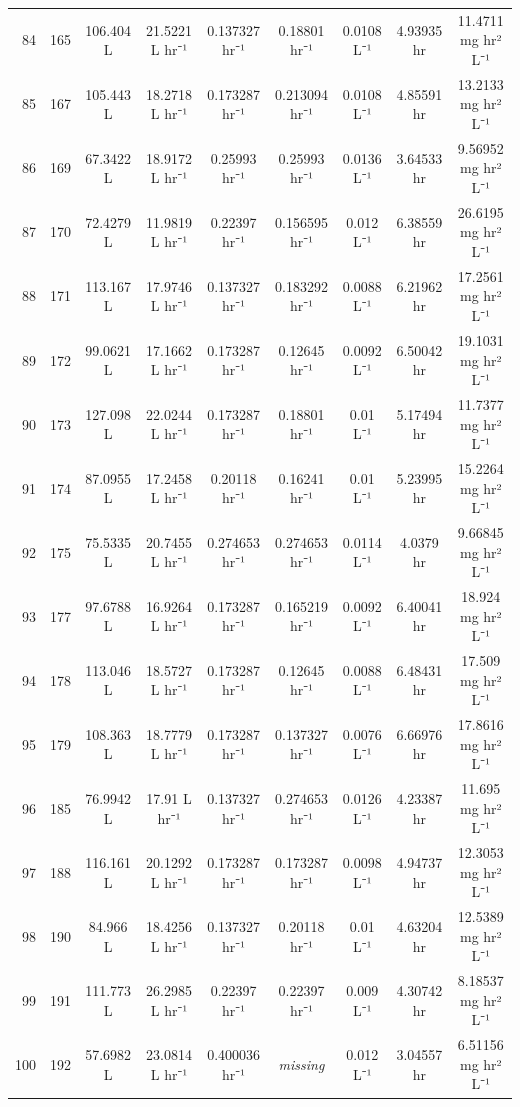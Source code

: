 \documentclass[12pt,a4paper]{article}
\begin{document}
\begin{tabular}{r|cccccccc}
	84 & 165 & 106.404 L & 21.5221 L hr⁻¹ & 0.137327 hr⁻¹ & 0.18801 hr⁻¹ & 0.0108 L⁻¹ & 4.93935 hr & 11.4711 mg hr² L⁻¹ \\
	85 & 167 & 105.443 L & 18.2718 L hr⁻¹ & 0.173287 hr⁻¹ & 0.213094 hr⁻¹ & 0.0108 L⁻¹ & 4.85591 hr & 13.2133 mg hr² L⁻¹ \\
	86 & 169 & 67.3422 L & 18.9172 L hr⁻¹ & 0.25993 hr⁻¹ & 0.25993 hr⁻¹ & 0.0136 L⁻¹ & 3.64533 hr & 9.56952 mg hr² L⁻¹ \\
	87 & 170 & 72.4279 L & 11.9819 L hr⁻¹ & 0.22397 hr⁻¹ & 0.156595 hr⁻¹ & 0.012 L⁻¹ & 6.38559 hr & 26.6195 mg hr² L⁻¹ \\
	88 & 171 & 113.167 L & 17.9746 L hr⁻¹ & 0.137327 hr⁻¹ & 0.183292 hr⁻¹ & 0.0088 L⁻¹ & 6.21962 hr & 17.2561 mg hr² L⁻¹ \\
	89 & 172 & 99.0621 L & 17.1662 L hr⁻¹ & 0.173287 hr⁻¹ & 0.12645 hr⁻¹ & 0.0092 L⁻¹ & 6.50042 hr & 19.1031 mg hr² L⁻¹ \\
	90 & 173 & 127.098 L & 22.0244 L hr⁻¹ & 0.173287 hr⁻¹ & 0.18801 hr⁻¹ & 0.01 L⁻¹ & 5.17494 hr & 11.7377 mg hr² L⁻¹ \\
	91 & 174 & 87.0955 L & 17.2458 L hr⁻¹ & 0.20118 hr⁻¹ & 0.16241 hr⁻¹ & 0.01 L⁻¹ & 5.23995 hr & 15.2264 mg hr² L⁻¹ \\
	92 & 175 & 75.5335 L & 20.7455 L hr⁻¹ & 0.274653 hr⁻¹ & 0.274653 hr⁻¹ & 0.0114 L⁻¹ & 4.0379 hr & 9.66845 mg hr² L⁻¹ \\
	93 & 177 & 97.6788 L & 16.9264 L hr⁻¹ & 0.173287 hr⁻¹ & 0.165219 hr⁻¹ & 0.0092 L⁻¹ & 6.40041 hr & 18.924 mg hr² L⁻¹ \\
	94 & 178 & 113.046 L & 18.5727 L hr⁻¹ & 0.173287 hr⁻¹ & 0.12645 hr⁻¹ & 0.0088 L⁻¹ & 6.48431 hr & 17.509 mg hr² L⁻¹ \\
	95 & 179 & 108.363 L & 18.7779 L hr⁻¹ & 0.173287 hr⁻¹ & 0.137327 hr⁻¹ & 0.0076 L⁻¹ & 6.66976 hr & 17.8616 mg hr² L⁻¹ \\
	96 & 185 & 76.9942 L & 17.91 L hr⁻¹ & 0.137327 hr⁻¹ & 0.274653 hr⁻¹ & 0.0126 L⁻¹ & 4.23387 hr & 11.695 mg hr² L⁻¹ \\
	97 & 188 & 116.161 L & 20.1292 L hr⁻¹ & 0.173287 hr⁻¹ & 0.173287 hr⁻¹ & 0.0098 L⁻¹ & 4.94737 hr & 12.3053 mg hr² L⁻¹ \\
	98 & 190 & 84.966 L & 18.4256 L hr⁻¹ & 0.137327 hr⁻¹ & 0.20118 hr⁻¹ & 0.01 L⁻¹ & 4.63204 hr & 12.5389 mg hr² L⁻¹ \\
	99 & 191 & 111.773 L & 26.2985 L hr⁻¹ & 0.22397 hr⁻¹ & 0.22397 hr⁻¹ & 0.009 L⁻¹ & 4.30742 hr & 8.18537 mg hr² L⁻¹ \\
	100 & 192 & 57.6982 L & 23.0814 L hr⁻¹ & 0.400036 hr⁻¹ & \emph{missing} & 0.012 L⁻¹ & 3.04557 hr & 6.51156 mg hr² L⁻¹ \\

\end{tabular}
\end{document}
